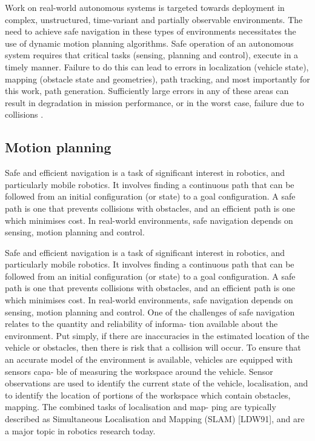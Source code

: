 Work on real-world autonomous systems is targeted towards deployment in complex, unstructured, 
time-variant and partially observable environments. The need to achieve safe navigation in these types of environments 
necessitates the use of dynamic motion planning algorithms.
Safe operation of an autonomous system requires that critical tasks (sensing, planning and
control), execute in a timely manner. Failure to do this can lead to errors in localization (vehicle
state), mapping (obstacle state and geometries), path tracking, and most importantly for this
work, path generation. Sufficiently large errors in any of these areas can result in degradation
in mission performance, or in the worst case, failure due to collisions \cite{Walker2011}.



\subsection{Motion planning}

Safe and efficient navigation is a task of significant interest in robotics, and particularly
mobile robotics. It involves finding a continuous path that can be followed from an initial
configuration (or state) to a goal configuration. A safe path is one that prevents collisions with
obstacles, and an efficient path is one which minimises cost. In real-world environments, safe
navigation depends on sensing, motion planning and control.

Safe and efficient navigation is a task of significant interest in robotics, and particularly
mobile robotics. It involves finding a continuous path that can be followed from an initial
configuration (or state) to a goal configuration. A safe path is one that prevents collisions with
obstacles, and an efficient path is one which minimises cost. In real-world environments, safe
navigation depends on sensing, motion planning and control.
One of the challenges of safe navigation relates to the quantity and reliability of informa-
tion available about the environment. Put simply, if there are inaccuracies in the estimated
location of the vehicle or obstacles, then there is risk that a collision will occur. To ensure that
an accurate model of the environment is available, vehicles are equipped with sensors capa-
ble of measuring the workspace around the vehicle. Sensor observations are used to identify
the current state of the vehicle, localisation, and to identify the location of portions of the
workspace which contain obstacles, mapping. The combined tasks of localisation and map-
ping are typically described as Simultaneous Localisation and Mapping (SLAM) [LDW91],
and are a major topic in robotics research today.


